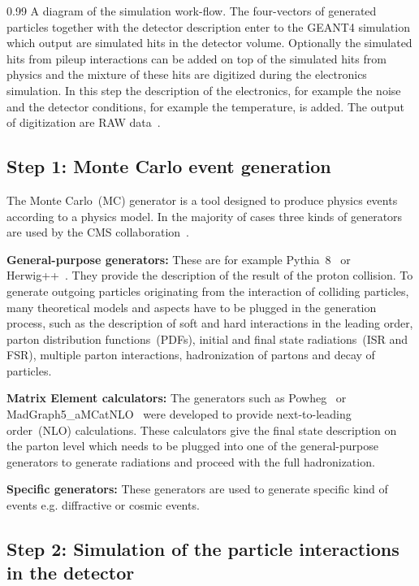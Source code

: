                  {0.99}       %
                 { A diagram of the simulation work-flow. The four-vectors of generated particles together with the detector description enter to the GEANT4 simulation which output are simulated hits in the detector volume. Optionally the simulated hits from pileup interactions can be added on top of the simulated hits from physics and the mixture of these hits are digitized during the electronics simulation. In this step the description of the electronics, for example the noise and the detector conditions, for example the temperature, is added. The output of digitization are RAW data~\cite{website:simuBasics}. }


\subsection{Step 1: Monte Carlo event generation}

The Monte Carlo~(MC) generator is a tool designed to produce physics events according to a physics model. In the majority of cases three kinds of generators are used by the CMS collaboration~\cite{website:generation, website:generationIntro}. 

\textbf{General-purpose generators: }
These are for example Pythia~8~\cite{Sjostrand:2014zea} or Herwig++~\cite{Bahr:2008pv}. They provide the description of the result of the proton collision. To generate outgoing particles originating from the interaction of colliding particles, many theoretical models and aspects have to be plugged in the generation process, such as the description of soft and hard interactions in the leading order, parton distribution functions~(PDFs), initial and final state radiations~(ISR and FSR), multiple parton interactions, hadronization of partons and decay of particles.

\textbf{Matrix Element calculators: }
The generators such as Powheg~\cite{Oleari:2010nx} or MadGraph5\_aMCatNLO~\cite{Alwall:2014hca} were developed to provide next-to-leading order~(NLO) calculations. These calculators give the final state description on the parton level which needs to be plugged into one of the general-purpose generators to generate radiations and proceed with the full hadronization.

\textbf{Specific generators: }
These generators are used to generate specific kind of events e.g. diffractive or cosmic events.

\subsection{Step 2: Simulation of the particle interactions in the detector}

